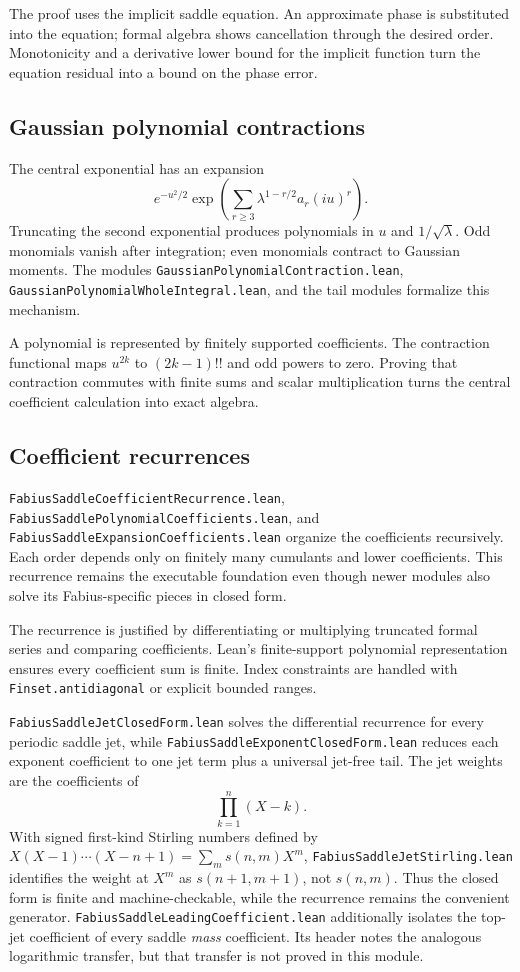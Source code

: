 \documentclass[11pt,oneside]{article}
\theoremstyle{definition}
\theoremstyle{remark}
\begin{document}
The proof uses the implicit saddle equation.  An approximate phase is substituted into the equation; formal algebra shows cancellation through the desired order.  Monotonicity and a derivative lower bound for the implicit function turn the equation residual into a bound on the phase error.

\subsection{Gaussian polynomial contractions}
The central exponential has an expansion
\[
  e^{-u^2/2}
  \exp\!\left(
    \sum_{r\geq3}\lambda^{1-r/2}a_r(iu)^r
  \right).
\]
Truncating the second exponential produces polynomials in \(u\) and \(1/\sqrt\lambda\).  Odd monomials vanish after integration; even monomials contract to Gaussian moments.  The modules \nolinkurl{GaussianPolynomialContraction.lean}, \nolinkurl{GaussianPolynomialWholeIntegral.lean}, and the tail modules formalize this mechanism.

A polynomial is represented by finitely supported coefficients.  The contraction functional maps \(u^{2k}\) to \((2k-1)!!\) and odd powers to zero.  Proving that contraction commutes with finite sums and scalar multiplication turns the central coefficient calculation into exact algebra.

\subsection{Coefficient recurrences}
\nolinkurl{FabiusSaddleCoefficientRecurrence.lean}, \nolinkurl{FabiusSaddlePolynomialCoefficients.lean}, and \nolinkurl{FabiusSaddleExpansionCoefficients.lean} organize the coefficients recursively.  Each order depends only on finitely many cumulants and lower coefficients.  This recurrence remains the executable foundation even though newer modules also solve its Fabius-specific pieces in closed form.

The recurrence is justified by differentiating or multiplying truncated formal series and comparing coefficients.  Lean's finite-support polynomial representation ensures every coefficient sum is finite.  Index constraints are handled with \nolinkurl{Finset.antidiagonal} or explicit bounded ranges.

\nolinkurl{FabiusSaddleJetClosedForm.lean} solves the differential recurrence for
every periodic saddle jet, while \nolinkurl{FabiusSaddleExponentClosedForm.lean}
reduces each exponent coefficient to one jet term plus a universal jet-free
tail.  The jet weights are the coefficients of
\[
  \prod_{k=1}^{n}(X-k).
\]
With signed first-kind Stirling numbers defined by
\(X(X-1)\cdots(X-n+1)=\sum_m s(n,m)X^m\),
\nolinkurl{FabiusSaddleJetStirling.lean} identifies the weight at \(X^m\) as
\(s(n+1,m+1)\), not \(s(n,m)\).  Thus the closed form is finite and
machine-checkable, while the recurrence remains the convenient generator.
\nolinkurl{FabiusSaddleLeadingCoefficient.lean} additionally isolates the top-jet
coefficient of every saddle \emph{mass} coefficient.  Its header notes the
analogous logarithmic transfer, but that transfer is not proved in this
module.
\end{document}

